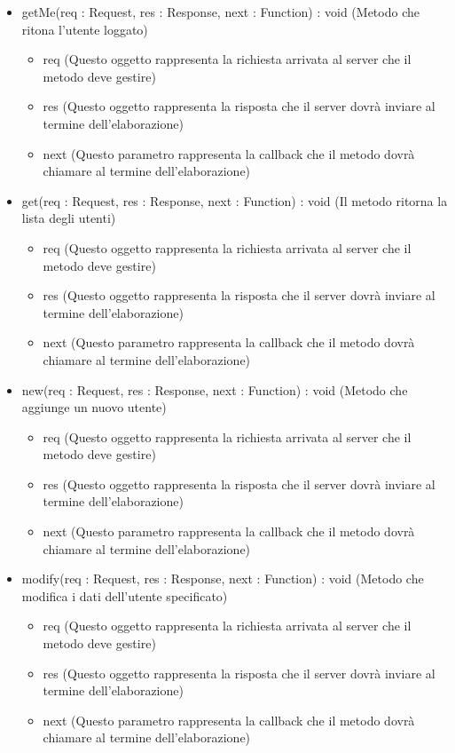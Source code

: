 \begin{description}
\begin{itemize}
\item getMe(req : Request, res : Response, next : Function) : void (Metodo che ritona l'utente loggato)\begin{itemize}
\item req (Questo oggetto rappresenta la richiesta arrivata al server che il metodo deve gestire)
\item res (Questo oggetto rappresenta la risposta che il server dovrà inviare al termine dell'elaborazione)
\item next (Questo parametro rappresenta la callback che il metodo dovrà chiamare al termine dell’elaborazione)
\end{itemize}

\item get(req : Request, res : Response, next : Function) : void (Il metodo ritorna la lista degli utenti)\begin{itemize}
\item req (Questo oggetto rappresenta la richiesta arrivata al server che il metodo deve gestire)
\item res (Questo oggetto rappresenta la risposta che il server dovrà inviare al termine dell'elaborazione)
\item next (Questo parametro rappresenta la callback che il metodo dovrà chiamare al termine dell’elaborazione)
\end{itemize}

\item new(req : Request, res : Response, next : Function) : void (Metodo che aggiunge un nuovo utente)\begin{itemize}
\item req (Questo oggetto rappresenta la richiesta arrivata al server che il metodo deve gestire)
\item res (Questo oggetto rappresenta la risposta che il server dovrà inviare al termine dell'elaborazione)
\item next (Questo parametro rappresenta la callback che il metodo dovrà chiamare al termine dell’elaborazione)
\end{itemize}

\item modify(req : Request, res : Response, next : Function) : void (Metodo che modifica i dati dell'utente specificato)\begin{itemize}
\item req (Questo oggetto rappresenta la richiesta arrivata al server che il metodo deve gestire)
\item res (Questo oggetto rappresenta la risposta che il server dovrà inviare al termine dell'elaborazione)
\item next (Questo parametro rappresenta la callback che il metodo dovrà chiamare al termine dell’elaborazione)
\end{itemize}


\end{itemize}
\end{description}
